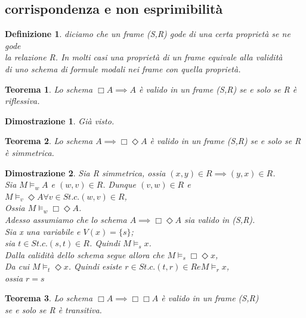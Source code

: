 \documentclass[a4paper,12pt]{article}
\theoremstyle{def}
\newtheorem*{definition}{Definizione}
\theoremstyle{prop}
\theoremstyle{esempio}
\theoremstyle{dimostrazione}
\newtheorem*{dimostrazione}{Dimostrazione}
\theoremstyle{teo}
\newtheorem*{teorema}{Teorema}
\theoremstyle{osservazione}
\begin{document}
\subsection{corrispondenza e non esprimibilità}
\begin{definition}
	diciamo che un frame (S,R) gode di una certa proprietà se ne gode\\
	la relazione R. In molti casi una proprietà di un frame equivale alla validità\\
	di uno schema di formule modali nei frame con quella proprietà.\\
\end{definition}
\begin{teorema}
	Lo schema \(\Box A \implies A\) è valido in un frame (S,R) se e solo se R è riflessiva.
\end{teorema}
\begin{dimostrazione}
	Già visto.
\end{dimostrazione}
\begin{teorema}
	Lo schema \( A \implies \Box \Diamond A\) è valido in un frame (S,R) se e solo se R è simmetrica.
\end{teorema}
\begin{dimostrazione}
	Sia R simmetrica, ossia \((x,y) \in R \implies (y,x) \in R\).\\
	Sia \(M \vDash_w A\) e \((w,v) \in R\). Dunque \((v,w) \in R\) e \(M \vDash_v \Diamond A \forall v \in S t.c. (w,v) \in R\),\\
	Ossia \(M \vDash_w \Box \Diamond A\).\\
	Adesso assumiamo che lo schema \(A \implies \Box \Diamond A \) sia valido in (S,R).\\
	Sia x una variabile e \(V(x) = \{s\}\);\\
	sia \(t \in S t.c. (s,t) \in R\). Quindi \(M \vDash_s x\).\\
	Dalla calidità dello schema segue allora che \(M \vDash_s \Box \Diamond x\),\\
	Da cui \(M \vDash_t \Diamond x\). Quindi esiste \(r \in S t.c. (t,r) \in R e M \vDash_r x\),\\
	ossia \(r = s\)
\end{dimostrazione}
\begin{teorema}
	Lo schema \(\Box A \implies \Box \Box A\) è valido in un frame (S,R)\\
	se e solo se R è transitiva.
\end{teorema}
\end{document}
